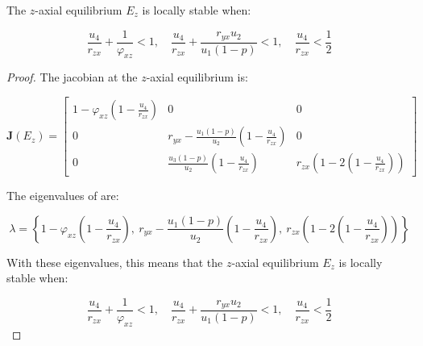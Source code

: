 \begin{theorem}\label{thm:eq-axial-z-stability}
    The $z$-axial equilibrium $E_z$ is locally stable when:

    \begin{equation*}
        \frac{u_4}{r_{zx}}+\frac{1}{\varphi_{xz}} < 1,\quad
        \frac{u_4}{r_{zx}}+\frac{r_{yx}u_2}{u_1\left(1-p\right)} < 1,\quad
        \frac{u_4}{r_{zx}} < \frac{1}{2}
    \end{equation*}
\end{theorem}
\begin{proof}
    The jacobian at the $z$-axial equilibrium is:

    \begin{equation}\label{matrix:jacobian-axial-z}
        \textbf{J}\left(E_z\right) = \begin{bmatrix}
            1-\varphi_{xz}\left(1-\frac{u_4}{r_{zx}}\right) & 0 & 0\\
            0 & r_{yx}-\frac{u_1\left(1-p\right)}{u_2}\left(1-\frac{u_4}{r_{zx}}\right) & 0\\
            0 & \frac{u_3\left(1-p\right)}{u_2}\left(1-\frac{u_4}{r_{zx}}\right) & r_{zx}\left(1-2\left(1-\frac{u_4}{r_{zx}}\right)\right)
        \end{bmatrix}
    \end{equation}

    The eigenvalues of  are:
    
    \begin{equation*}
        \lambda=\left\{1-\varphi_{xz}\left(1-\frac{u_4}{r_{zx}}\right),\ r_{yx}-\frac{u_1\left(1-p\right)}{u_2}\left(1-\frac{u_4}{r_{zx}}\right),\ r_{zx}\left(1-2\left(1-\frac{u_4}{r_{zx}}\right)\right)\right\}
    \end{equation*}
    
    With these eigenvalues, this means that the $z$-axial equilibrium $E_z$ is locally stable when:

    \begin{equation*}
        \frac{u_4}{r_{zx}}+\frac{1}{\varphi_{xz}} < 1,\quad \frac{u_4}{r_{zx}}+\frac{r_{yx}u_2}{u_1\left(1-p\right)}<1,\quad \frac{u_4}{r_{zx}}<\frac{1}{2}
    \end{equation*}
\end{proof}

